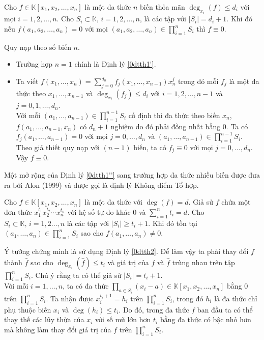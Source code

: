 \begin{dl}\label{0dtth2}
Cho $f\in \mathbb{K}[x_1,x_2, \dots , x_n]$ là một đa thức $n$ biến thỏa mãn $\deg_{x_i}(f) \leq d_i$ với mọi $i=1,2, \dots, n$. Cho $S_i \subset \mathbb{K},\, i=1,2,\dots , n$, là các tập với $|S_i|=d_i+1$. Khi đó nếu $f(a_1,a_2,\dots, a_n)=0$ với mọi $\displaystyle (a_1,a_2,\dots, a_n)\in \prod \limits_{i=1}^{n}S_i$ thì $f\equiv 0$.
\end{dl}
 Quy nạp theo số biến $n$. 
	\begin{itemize}
	\item Trường hợp $n=1$ chính là Định lý \ref{0dtth1'}.
	\item Ta viết $\displaystyle f(x_1,\dots, x_n)= \sum \limits_{j=0}^{d_n}f_j(x_1,\dots, x_{n-1})x_n^j$ trong đó mỗi $f_j$ là một đa thức theo $x_1,\dots, x_{n-1}$ và $\deg_{x_i}(f_j) \leq d_i$ với $i=1,2,\dots, n-1$ và $j=0,1,\dots,d_n$.\\
Với mỗi $\displaystyle (a_1, \dots , a_{n-1}) \in \prod \limits_{i=1}^{n-1}S_i$ cố định thì đa thức theo biến $x_n$, $f(a_1,\dots, a_{n-1},x_n)$ có $d_n+1$ nghiệm do đó phải đồng nhất bằng $0$. Ta có $f_j(a_1, \dots, a_{n-1})=0$ với mọi $j=0,\dots, d_n$ và $\displaystyle (a_1, \dots , a_{n-1}) \in \prod \limits_{i=1}^{n-1}S_i$. Theo giả thiết quy nạp với $(n-1)$ biến, ta có $f_j\equiv 0$ với mọi $j=0,\dots ,d_n$. Vậy $f \equiv 0$.
	\end{itemize}
Một mở rộng của Định lý \ref{0dtth1''} sang trường hợp đa thức nhiều biến được đưa ra bởi Alon (1999) và được gọi là định lý Không điểm Tổ hợp.
\begin{dl}
Cho $f \in \mathbb{K}\left[ x_1, x_2, \dots , x_n \right]$ là một đa thức với $\deg (f)=d$. Giả sử $f$ chứa một đơn thức $x_1^{t_1}x_2^{t_2}\cdots x_n^{t_n}$ với hệ số tự do khác $0$ và $\displaystyle \sum \limits_{i=1}^{n}t_i=d$. Cho $S_i \subset \mathbb{K},\, i=1,2\dots, n$ là các tập với $|S_i|\geq t_i+1$. Khi đó tồn tại $\displaystyle (a_1,\dots,a_n) \in \prod \limits_{i=1}^{n}S_i$ sao cho $f(a_1,\dots,a_n)\neq 0$.
\end{dl}
 Ý tưởng chứng minh là sử dụng Định lý \ref{0dtth2}. Để làm vậy ta phải thay đổi $f$ thành $\widehat f$ sao cho $\deg_{x_i}(\widehat{f}) \leq t_i$ và giá trị của $f$ và $\widehat{f}$ trùng nhau trên tập $\displaystyle \prod \limits_{i=1}^{n}S_i$. Chú ý rằng ta có thể giả sử $|S_i|=t_i+1$.\\
Với mỗi $i=1,\dots,n$, ta có đa thức $\displaystyle \prod \limits_{a\in S_i}(x_i-a) \in \mathbb{K}[x_1,x_2,\dots, x_n]$ bằng $0$ trên $\displaystyle \prod \limits_{i=1}^{n}S_i$. Ta nhận được $x_{i}^{t_i+1}=h_i$ trên $\displaystyle \prod \limits_{i=1}^{n}S_i$, trong đó $h_i$ là đa thức chỉ phụ thuộc biến $x_i$ và $\deg (h_i)\leq t_i$. Do đó, trong đa thức $f$ ban đầu ta có thể thay thế các lũy thừa của $x_i$ với số mũ lớn hơn $t_i$ bằng đa thức có bậc nhỏ hơn mà không làm thay đổi giá trị của $f$ trên  $\displaystyle \prod \limits_{i=1}^{n}S_i$.\\
